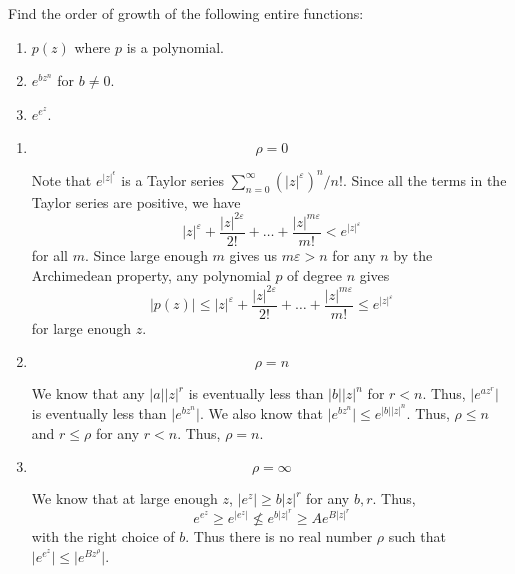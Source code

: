 \documentclass[12 pt, letterpaper]{hmcpset}
\begin{document}
\begin{problem}[2.]
	Find the order of growth of the following entire functions:
	\begin{enumerate}
		\item $p(z)$ where $p$ is a polynomial.
		\item $e^{bz^{n}}$ for $b \neq 0$.
		\item $e^{e^{z}}$.
	\end{enumerate}
\end{problem}

\begin{solution}
	\begin{enumerate}
		\item
			\[
				\boxed{
					\rho = 0
				}
			\]

			Note that $e^{\lvert z \rvert^{\epsilon}}$ is a Taylor series $\sum_{n = 0}^{\infty} (\lvert z \rvert^{\varepsilon})^{n} / n!$. Since all the terms in the Taylor series are positive, we have
			\[
				\lvert z \rvert^{\varepsilon} + \frac{\lvert z \rvert^{2 \varepsilon}}{2!} + \dots + \frac{\lvert z \rvert^{m \varepsilon}}{m!} < e^{\lvert z \rvert^{\varepsilon}}
			\]
			for all $m$. Since large enough $m$ gives us $m \varepsilon > n$ for any $n$ by the Archimedean property, any polynomial $p$ of degree $n$ gives
			\[
				\lvert p(z) \rvert \le \lvert z \rvert^{\varepsilon} + \frac{\lvert z \rvert^{2 \varepsilon}}{2!} + \dots + \frac{\lvert z \rvert^{m \varepsilon}}{m!} \le e^{\lvert z \rvert^\varepsilon}
			\]
			for large enough $z$.
		\item
			\[
				\boxed{
					\rho = n	
				}
			\]

			We know that any $\lvert a \rvert \lvert z \rvert^{r}$ is eventually less than $\lvert b \rvert \lvert z \rvert^{n}$ for $r < n$. Thus, $\lvert e^{a z^{r}} \rvert$ is eventually less than $\lvert e^{b z^{n}} \rvert$. We also know that $\lvert e^{b z^{n}} \rvert \le e^{\lvert b \rvert \lvert z \rvert^{n}}$. Thus, $\rho \le n$ and $r \le \rho$ for any $r < n$. Thus, $\rho = n$.
		\item
			\[
				\boxed{
					\rho = \infty
				}
			\]

			We know that at large enough $z$, $\lvert e^{z} \rvert \ge b \lvert z \rvert^{r}$ for any $b, r$. Thus,
			\[
				e^{e^{z}} \ge e^{\lvert e^{z} \rvert} \not \le e^{b \lvert z \rvert^{r}} \ge A e^{B \lvert z \rvert^{r}}
			\]
			with the right choice of $b$. Thus there is no real number $\rho$ such that $\lvert e^{e^{z}} \rvert \le \lvert e^{B z^{\rho}} \rvert$.
	\end{enumerate}
\end{solution}
\end{document}
